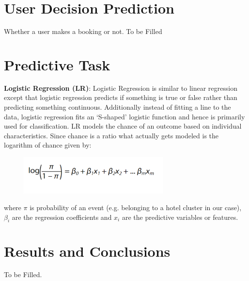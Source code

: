 \documentclass[conference]{IEEEtran}
\begin{document}
\section{\textbf{User Decision Prediction}}
Whether a user makes a booking or not.
To be Filled
\section{\textbf{Predictive Task}}
\textbf{Logistic Regression (LR)}: Logistic Regression is similar to linear regression except that logistic regression predicts if something is true or false rather than predicting something continuous. Additionally instead of fitting a line to the data, logistic regression fits an ‘S-shaped’ logistic function and hence is primarily used for classification. LR models the chance of an outcome based on individual characteristics. Since chance is a ratio what actually gets modeled is the logarithm of chance given by:
\begin{figure}[ht!] %
\centering
\includegraphics[width=3in]{LR.PNG}
\label{pearson}
\end{figure}

where $\pi$ is probability of an event (e.g. belonging to a hotel cluster in our case), \(\beta_i\) are the regression coefficients and \(x_i\) are the predictive variables or features. 







\section{\textbf{Results and Conclusions}}
To be Filled.
\end{document}
